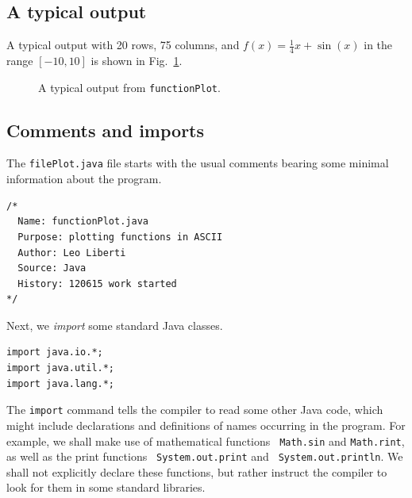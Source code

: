 \documentclass[a4paper]{book}
\theoremstyle{changebreak}                %
\begin{document}
\subsection{A typical output}
\label{s:java:example:output}
A typical output with 20 rows, 75 columns, and
$f(x)=\frac{1}{4}x+\sin(x)$ in the range $[-10,10]$ is shown in
Fig.~\ref{f:fplot}.
\begin{figure}[!ht]
\begin{center}
\fbox{\begin{minipage}{13cm}
{ \small
  
}
\end{minipage}}
\end{center}
\caption{A typical output from {\tt functionPlot}.}
\label{f:fplot}
\end{figure}

\subsection{Comments and imports}
The {\tt filePlot.java} file starts with the usual
comments bearing some minimal information about the
program.
\begin{verbatim}
/*
  Name: functionPlot.java
  Purpose: plotting functions in ASCII
  Author: Leo Liberti
  Source: Java
  History: 120615 work started
*/
\end{verbatim}

Next, we {\it import} some standard Java classes.
\begin{verbatim}
import java.io.*;
import java.util.*;
import java.lang.*;
\end{verbatim}
The {\tt import} command tells the compiler to read some other Java
code, which might include declarations and
definitions of names occurring in the program. For
example, we shall make use of mathematical functions {\tt
  Math.sin} and {\tt Math.rint},
as well as the print functions {\tt
  System.out.print} and {\tt
  System.out.println}. We shall not explicitly declare these
functions, but rather instruct the compiler to look for them in some
standard libraries.
\end{document}
